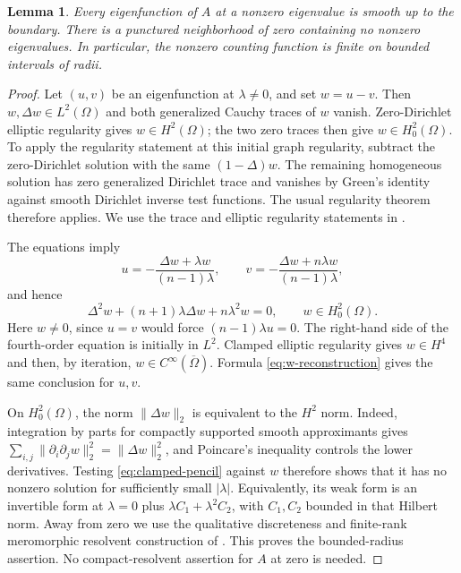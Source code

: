 \documentclass[11pt,a4paper]{article}
\newtheorem{lemma}[lemma]{Lemma}
\theoremstyle{remark}
\numberwithin{equation}{section}
\begin{document}
\begin{lemma}\label{lem:regularity}
Every eigenfunction of $A$ at a nonzero eigenvalue is smooth up to the
boundary. There is a punctured neighborhood of zero containing no nonzero
eigenvalues. In particular, the nonzero counting function is finite on
bounded intervals of radii.
\end{lemma}
\begin{proof}
Let $(u,v)$ be an eigenfunction at $\lambda\ne0$, and set $w=u-v$.
Then $w,\Delta w\in L^2(\Omega)$ and both generalized Cauchy traces of
$w$ vanish. Zero-Dirichlet elliptic regularity gives $w\in H^2(\Omega)$;
the two zero traces then give $w\in H_0^2(\Omega)$. To apply the regularity
statement at this initial graph regularity, subtract the zero-Dirichlet
solution with the same $(1-\Delta)w$. The remaining homogeneous solution
has zero generalized Dirichlet trace and vanishes by Green's identity
against smooth Dirichlet inverse test functions. The usual regularity
theorem therefore applies. We use the trace and elliptic regularity
statements in \cite[Chapter~11, especially Theorem~11.14]{Grubb}.

The equations imply
\begin{equation}\label{eq:w-reconstruction}
 u=-\frac{\Delta w+\lambda w}{(n-1)\lambda},\qquad
 v=-\frac{\Delta w+n\lambda w}{(n-1)\lambda},
\end{equation}
and hence
\begin{equation}\label{eq:clamped-pencil}
 \Delta^2w+(n+1)\lambda\Delta w+n\lambda^2w=0,
 \qquad w\in H_0^2(\Omega).
\end{equation}
Here $w\ne0$, since $u=v$ would force $(n-1)\lambda u=0$.
The right-hand side of the fourth-order equation is initially in $L^2$.
Clamped elliptic regularity gives $w\in H^4$ and then, by iteration,
$w\in C^\infty(\overline\Omega)$. Formula \eqref{eq:w-reconstruction}
gives the same conclusion for $u,v$.

On $H_0^2(\Omega)$, the norm $\|\Delta w\|_2$ is equivalent to the
$H^2$ norm. Indeed, integration by parts for compactly supported smooth
approximants gives $\sum_{i,j}\|\partial_i\partial_jw\|_2^2
=\|\Delta w\|_2^2$, and Poincare's inequality controls the lower
derivatives. Testing \eqref{eq:clamped-pencil} against $w$ therefore shows
that it has no nonzero solution for sufficiently small $|\lambda|$.
Equivalently, its weak form is an invertible form at $\lambda=0$ plus
$\lambda C_1+\lambda^2C_2$, with $C_1,C_2$ bounded in that Hilbert norm.
Away from zero we use the qualitative discreteness and finite-rank
meromorphic resolvent construction of \cite[Theorem~1.1 and Section~3]{PV}.
This proves the bounded-radius assertion. No compact-resolvent assertion
for $A$ at zero is needed.
\end{proof}
\end{document}
